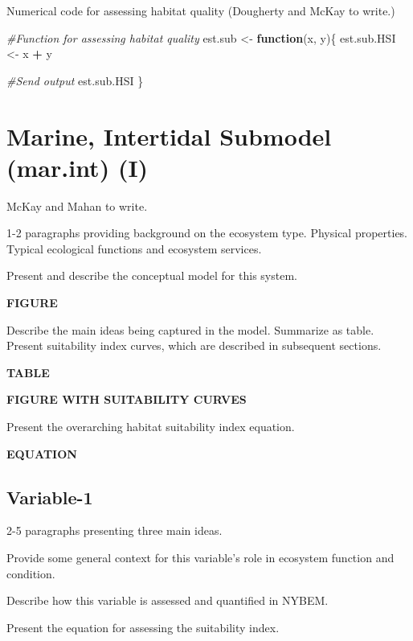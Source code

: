 \documentclass[
]{book}
\newenvironment{Shaded}{\begin{snugshade}}{\end{snugshade}}
\newcommand{\CommentTok}[1]{\textcolor[rgb]{0.56,0.35,0.01}{\textit{#1}}}
\newcommand{\ControlFlowTok}[1]{\textcolor[rgb]{0.13,0.29,0.53}{\textbf{#1}}}
\newcommand{\NormalTok}[1]{#1}
\newcommand{\OperatorTok}[1]{\textcolor[rgb]{0.81,0.36,0.00}{\textbf{#1}}}
\newcommand{\StringTok}[1]{\textcolor[rgb]{0.31,0.60,0.02}{#1}}
\begin{document}
Numerical code for assessing habitat quality ({Dougherty and McKay to write.})

\begin{Shaded}
\begin{Highlighting}[]
\CommentTok{#Function for assessing habitat quality}
\NormalTok{est.sub <-}\StringTok{ }\ControlFlowTok{function}\NormalTok{(x, y)\{}
\NormalTok{  est.sub.HSI <-}\StringTok{ }\NormalTok{x }\OperatorTok{+}\StringTok{ }\NormalTok{y}

  \CommentTok{#Send output}
\NormalTok{  est.sub.HSI}
\NormalTok{\}}
\end{Highlighting}
\end{Shaded}

\hypertarget{marine-intertidal-submodel-mar.int-i}{%
\section{Marine, Intertidal Submodel (mar.int) (I)}\label{marine-intertidal-submodel-mar.int-i}}

{McKay and Mahan to write.}

1-2 paragraphs providing background on the ecosystem type. Physical properties. Typical ecological functions and ecosystem services.

Present and describe the conceptual model for this system.

\textbf{FIGURE}

Describe the main ideas being captured in the model. Summarize as table. Present suitability index curves, which are described in subsequent sections.

\textbf{TABLE}

\textbf{FIGURE WITH SUITABILITY CURVES}

Present the overarching habitat suitability index equation.

\textbf{EQUATION}

\hypertarget{variable-1-4}{%
\subsection{Variable-1}\label{variable-1-4}}

2-5 paragraphs presenting three main ideas.

Provide some general context for this variable's role in ecosystem function and condition.

Describe how this variable is assessed and quantified in NYBEM.

Present the equation for assessing the suitability index.
\end{document}

